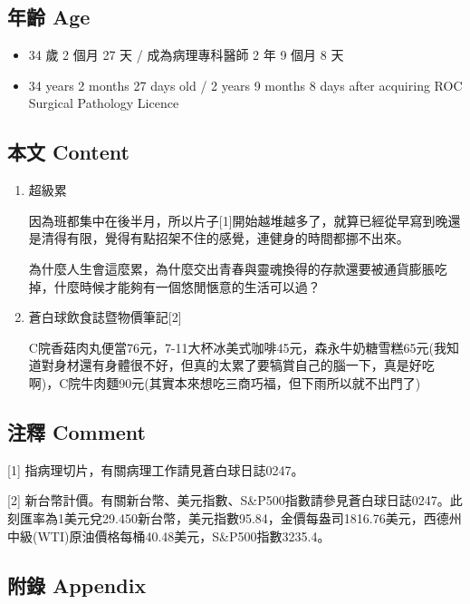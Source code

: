 \documentclass[
]{article}
\providecommand{\tightlist}{%
  \setlength{\itemsep}{0pt}\setlength{\parskip}{0pt}}
\begin{document}
\hypertarget{ux5e74ux9f61-age-19}{%
\subsection{年齡 Age}\label{ux5e74ux9f61-age-19}}

\begin{itemize}
\tightlist
\item
  34 歲 2 個月 27 天 / 成為病理專科醫師 2 年 9 個月 8 天
\item
  34 years 2 months 27 days old / 2 years 9 months 8 days after
  acquiring ROC Surgical Pathology Licence
\end{itemize}

\hypertarget{ux672cux6587-content-19}{%
\subsection{本文 Content}\label{ux672cux6587-content-19}}

\begin{enumerate}
\def\labelenumi{\arabic{enumi}.}
\item
  超級累

  因為班都集中在後半月，所以片子{[}1{]}開始越堆越多了，就算已經從早寫到晚還是清得有限，覺得有點招架不住的感覺，連健身的時間都挪不出來。

  為什麼人生會這麼累，為什麼交出青春與靈魂換得的存款還要被通貨膨脹吃掉，什麼時候才能夠有一個悠閒愜意的生活可以過？
\item
  蒼白球飲食誌暨物價筆記{[}2{]}

  C院香菇肉丸便當76元，7-11大杯冰美式咖啡45元，森永牛奶糖雪糕65元(我知道對身材還有身體很不好，但真的太累了要犒賞自己的腦一下，真是好吃啊)，C院牛肉麵90元(其實本來想吃三商巧福，但下雨所以就不出門了)
\end{enumerate}

\hypertarget{ux6ce8ux91cb-comment-19}{%
\subsection{注釋 Comment}\label{ux6ce8ux91cb-comment-19}}

{[}1{]} 指病理切片，有關病理工作請見蒼白球日誌0247。

{[}2{]}
新台幣計價。有關新台幣、美元指數、S\&P500指數請參見蒼白球日誌0247。此刻匯率為1美元兌29.450新台幣，美元指數95.84，金價每盎司1816.76美元，西德州中級(WTI)原油價格每桶40.48美元，S\&P500指數3235.4。

\hypertarget{ux9644ux9304-appendix-19}{%
\subsection{附錄 Appendix}\label{ux9644ux9304-appendix-19}}
\end{document}
